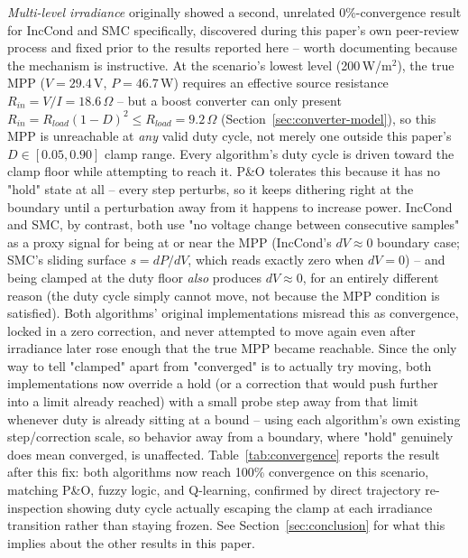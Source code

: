 \emph{Multi-level irradiance} originally showed a second, unrelated
0\%-convergence result for IncCond and SMC specifically, discovered during
this paper's own peer-review process and fixed prior to the results
reported here -- worth documenting because the mechanism is instructive.
At the scenario's lowest level (200\,W/m$^2$), the true MPP ($V=29.4\,$V,
$P=46.7\,$W) requires an effective source resistance
$R_{in}=V/I=18.6\,\Omega$ -- but a boost converter can only present
$R_{in}=R_{load}(1-D)^2 \le R_{load}=9.2\,\Omega$
(Section~\ref{sec:converter-model}), so this MPP is unreachable at
\emph{any} valid duty cycle, not merely one outside this paper's
$D\in[0.05,0.90]$ clamp range. Every algorithm's duty cycle is driven
toward the clamp floor while attempting to reach it. P\&O tolerates this
because it has no "hold" state at all -- every step perturbs, so it keeps
dithering right at the boundary until a perturbation away from it happens
to increase power. IncCond and SMC, by contrast, both use "no voltage
change between consecutive samples" as a proxy signal for being at or near
the MPP (IncCond's $dV\approx0$ boundary case; SMC's sliding surface
$s=dP/dV$, which reads exactly zero when $dV=0$) -- and being clamped at
the duty floor \emph{also} produces $dV\approx0$, for an entirely
different reason (the duty cycle simply cannot move, not because the MPP
condition is satisfied). Both algorithms' original implementations
misread this as convergence, locked in a zero correction, and never
attempted to move again even after irradiance later rose enough that the
true MPP became reachable. Since the only way to tell "clamped" apart from
"converged" is to actually try moving, both implementations now override a
hold (or a correction that would push further into a limit already
reached) with a small probe step away from that limit whenever duty is
already sitting at a bound -- using each algorithm's own existing
step/correction scale, so behavior away from a boundary, where "hold"
genuinely does mean converged, is unaffected. Table~\ref{tab:convergence}
reports the result after this fix: both algorithms now reach 100\%
convergence on this scenario, matching P\&O, fuzzy logic, and Q-learning,
confirmed by direct trajectory re-inspection showing duty cycle actually
escaping the clamp at each irradiance transition rather than staying
frozen. See Section~\ref{sec:conclusion} for what this implies about the
other results in this paper.

